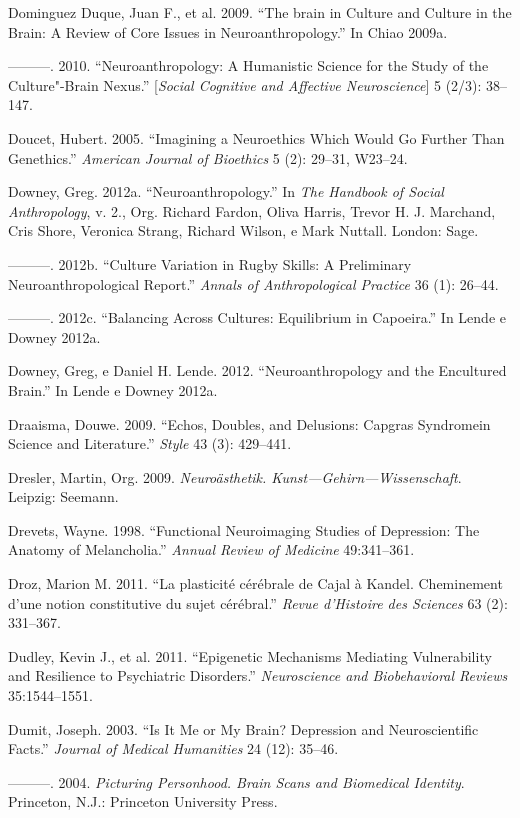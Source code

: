Dominguez Duque, Juan F., et al. 2009. ``The brain in Culture and
Culture in the Brain: A Review of Core Issues in Neuroanthropology.'' In
Chiao 2009a.

---------. 2010. ``Neuroanthropology: A Humanistic Science for the Study
of the Culture"-Brain Nexus.'' \emph{} {[}\emph{Social Cognitive and
Affective Neuroscience}{]} 5 (2/3): 38--147.

Doucet, Hubert. 2005. ``Imagining a Neuroethics Which Would Go Further
Than Genethics.'' \emph{American Journal of Bioethics} 5 (2): 29--31,
W23--24.

Downey, Greg. 2012a. ``Neuroanthropology.'' In \emph{The  Handbook
of Social Anthropology}, v. 2., Org. Richard Fardon, Oliva Harris,
Trevor H. J. Marchand, Cris Shore, Veronica Strang, Richard Wilson, e
Mark Nuttall. London: Sage.

---------. 2012b. ``Culture Variation in Rugby Skills: A Preliminary
Neuroanthropological Report.'' \emph{Annals of Anthropological Practice}
36 (1): 26--44.

---------. 2012c. ``Balancing Across Cultures: Equilibrium in
Capoeira.'' In Lende e Downey 2012a.

Downey, Greg, e Daniel H. Lende. 2012. ``Neuroanthropology and the
Encultured Brain.'' In Lende e Downey 2012a.

Draaisma, Douwe. 2009. ``Echos, Doubles, and Delusions: Capgras
Syndromein Science and Literature.'' \emph{Style} 43 (3): 429--441.

Dresler, Martin, Org. 2009. \emph{Neuroästhetik.
Kunst---Gehirn---Wissenschaft}. Leipzig: Seemann.

Drevets, Wayne. 1998. ``Functional Neuroimaging Studies of Depression:
The Anatomy of Melancholia.'' \emph{Annual Review of Medicine}
49:341--361.

Droz, Marion M. 2011. ``La plasticité cérébrale de Cajal à Kandel.
Cheminement d'une notion constitutive du sujet cérébral.'' \emph{Revue
d'Histoire des Sciences} 63 (2): 331--367.

Dudley, Kevin J., et al. 2011. ``Epigenetic Mechanisms Mediating
Vulnerability and Resilience to Psychiatric Disorders.''
\emph{Neuroscience and Biobehavioral Reviews} 35:1544--1551.

Dumit, Joseph. 2003. ``Is It Me or My Brain? Depression and
Neuroscientific Facts.'' \emph{Journal of Medical Humanities} 24 (12):
35--46.

---------. 2004. \emph{Picturing Personhood. Brain Scans and Biomedical
Identity}. Princeton, N.J.: Princeton University Press.

